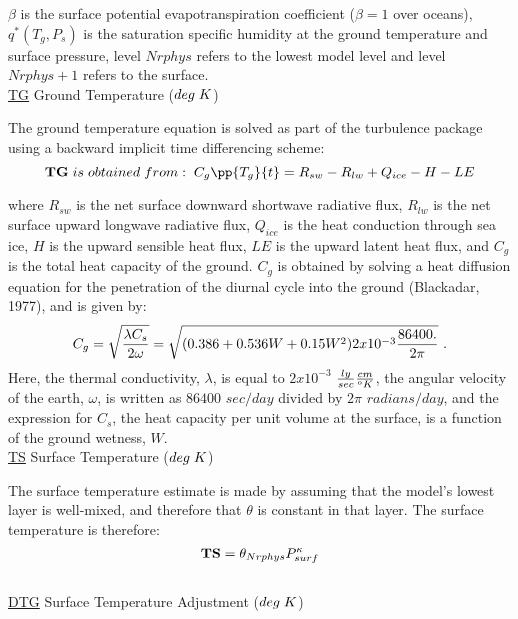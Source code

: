 \noindent
$\beta$ is the surface potential evapotranspiration coefficient ($\beta=1$ over oceans),
$q^*(T_g,P_s)$ is the saturation specific humidity at the ground temperature 
and surface pressure, level $Nrphys$ refers to the lowest model level and level $Nrphys+1$ 
refers to the surface.
\\

 
\noindent
{ \underline {TG}  Ground Temperature ($deg \hspace{.1cm} K$) }

\noindent
The ground temperature equation is solved as part of the turbulence package
using a backward implicit time differencing scheme:
\[
{\bf TG} \hspace{.1cm} is \hspace{.1cm} obtained \hspace{.1cm} from: \hspace{.1cm}
C_g\pp{T_g}{t} = R_{sw} - R_{lw} + Q_{ice} - H - LE
\]

\noindent
where $R_{sw}$ is the net surface downward shortwave radiative flux, $R_{lw}$ is the
net surface upward longwave radiative flux, $Q_{ice}$ is the heat conduction through
sea ice, $H$ is the upward sensible heat flux, $LE$ is the upward latent heat
flux, and $C_g$ is the total heat capacity of the ground. 
$C_g$ is obtained by solving a heat diffusion equation 
for the penetration of the diurnal cycle into the ground (Blackadar, 1977), and is given by:
\[
C_g = \sqrt{ {\lambda C_s \over {2 \omega} } } = \sqrt{(0.386 + 0.536W + 0.15W^2)2x10^{-3}
{ 86400. \over {2 \pi} } } \, \, .
\]
\noindent
Here, the thermal conductivity, $\lambda$, is equal to $2x10^{-3}$ ${ly\over{ sec}} 
{cm \over {^oK}}$, 
the angular velocity of the earth, $\omega$, is written as $86400$ $sec/day$ divided 
by $2 \pi$ $radians/
day$, and the expression for $C_s$, the heat capacity per unit volume at the surface, 
is a function of the ground wetness, $W$. 
\\

\noindent
{ \underline {TS}  Surface Temperature ($deg \hspace{.1cm} K$) }

\noindent
The surface temperature estimate is made by assuming that the model's lowest
layer is well-mixed, and therefore that $\theta$ is constant in that layer.
The surface temperature is therefore:
\[
{\bf TS} = \theta_{Nrphys} P^{\kappa}_{surf}
\]
\\
 
\noindent
{ \underline {DTG}  Surface Temperature Adjustment ($deg \hspace{.1cm} K$) }

